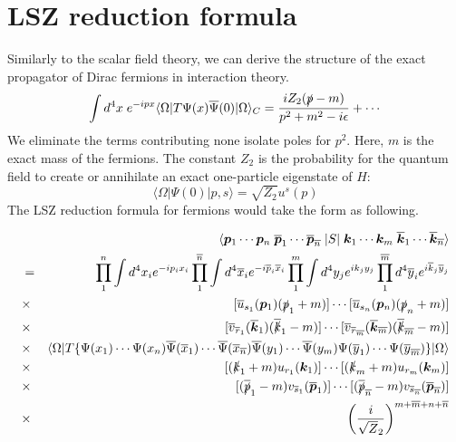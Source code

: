 \section{LSZ reduction formula}
Similarly to the scalar field theory, we can derive the structure of the exact propagator of Dirac fermions in interaction theory.
\[\int d^4x \; e^{-ipx} \langle \Omega | T \Psi(x) \overline{\Psi}(0) | \Omega \rangle_C = \frac{iZ_2(\slashed{p}-m)}{p^2+m^2-i\epsilon} + \cdots \]
We eliminate the terms contributing none isolate poles for $p^2$. Here, $m$ is the exact mass of the fermions. The constant $Z_2$ is the probability for the quantum field to create or annihilate an exact one-particle eigenstate of $H$:
\[\langle \Omega | \Psi(0) | p,s \rangle = \sqrt{Z_2} u^s(p)\]
The LSZ reduction formula for fermions would take the form as following.
\\

\begin{newthem}
\begin{eqnarray}
&\phantom{=}& \langle \bm{p}_1 \cdots \bm{p}_n \;
\overline{\bm{p}}_1 \cdots \overline{\bm{p}}_{\overline{n}} \;
| S | \;
\bm{k}_1 \cdots \bm{k}_m \;
\overline{\bm{k}}_1 \cdots \overline{\bm{k}}_{\overline{n}} \rangle 
\nonumber \\
&=& \quad \prod_1^n \int d^4 x_i e^{-i p_ix_i }
\prod_1^{\overline{n}} \int d^4 \overline{x}_i e^{-i \overline{p}_i\overline{x}_i }
\prod_1^m \int d^4 y_j e^{ik_jy_j}
\prod_1^{\overline{m}} d^4 \overline{y}_i e^{i\overline{k}_j\overline{y}_j}
\nonumber \\
&\times & [\overline{u}_{s_1}(\bm{p}_1)(\slashed{p}_1+m)] \cdots [\overline{u}_{s_n}(\bm{p}_n)(\slashed{p}_n+m)]
\nonumber \\
&\times & [\overline{v}_{\overline{r}_1}(\overline{\bm{k}}_1)(\overline{\slashed{k}}_1 - m)] \cdots [\overline{v}_{\overline{r}_{\overline{m}}}(\overline{\bm{k}}_{\overline{m}})(\overline{\slashed{k}}_{\overline{m}} - m)]
\nonumber \\
&\times & \langle \Omega | T \{\Psi(x_1) \cdots \Psi(x_n)
\overline{\Psi}(\overline{x}_1) \cdots \overline{\Psi}(\overline{x}_{\overline{n}}) 
\overline{\Psi}(y_1) \cdots \overline{\Psi}(y_m)
\Psi(\overline{y}_1) \cdots \Psi(\overline{y}_{\overline{m}})\} 
| \Omega \rangle 
\nonumber \\
&\times & [(\slashed{k}_1+m) u_{r_1}(\bm{k}_1)] \cdots [(\slashed{k}_m+m)u_{r_m}(\bm{k}_m)] \nonumber \\
&\times & [(\overline{\slashed{p}}_1 - m) v_{\overline{s}_1}(\overline{\bm{p}}_1)] \cdots [(\overline{\slashed{p}}_{\overline{n}} - m) v_{\overline{s}_{\overline{n}}}(\overline{\bm{p}}_{\overline{n}})] \nonumber \\
&\times & \left( \frac{i}{\sqrt{Z}_2} \right) ^{m+\overline{m}+n+\overline{n}} \nonumber
\end{eqnarray}
\end{newthem}

